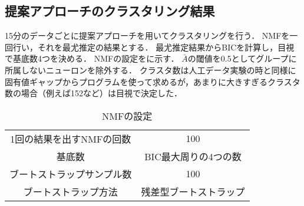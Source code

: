 \subsection{提案アプローチのクラスタリング結果}
15分のデータごとに提案アプローチを用いてクラスタリングを行う．
NMFを一回行い，それを最尤推定の結果とする．
最尤推定結果からBICを計算し，目視で基底数4つを決める．
NMFの設定をに示す．
$\bar{A}$の閾値を0.5としてグループに所属しないニューロンを除外する．
クラスタ数は人工データ実験の時と同様に固有値ギャップからプログラムを使って求めるが，あまりに大きすぎるクラスタ数の場合（例えば152など）は目視で決定した．

\begin{table}[htb]
  \center
  \begin{tabular}{c|c} \hline
		1回の結果を出すNMFの回数 & 100 \\
		基底数 & BIC最大周りの4つの数 \\
		ブートストラップサンプル数 & 100 \\
		ブートストラップ方法 & 残差型ブートストラップ \\ \hline
  \end{tabular}
  \caption{NMFの設定}
  \label{tab:exp4param2}
\end{table}


